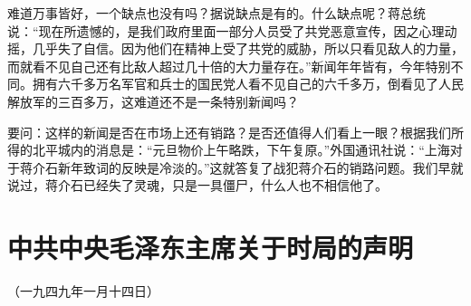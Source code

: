 \documentclass[UTF-8, a5paper, 12pt]{ctexart}
\begin{document}
难道万事皆好，一个缺点也没有吗？据说缺点是有的。什么缺点呢？蒋总统说：“现在所遗憾的，是我们政府里面一部分人员受了共党恶意宣传，因之心理动摇，几乎失了自信。因为他们在精神上受了共党的威胁，所以只看见敌人的力量，而就看不见自己还有比敌人超过几十倍的大力量存在。”新闻年年皆有，今年特别不同。拥有六千多万名军官和兵士的国民党人看不见自己的六千多万，倒看见了人民解放军的三百多万，这难道还不是一条特别新闻吗？

要问：这样的新闻是否在市场上还有销路？是否还值得人们看上一眼？根据我们所得的北平城内的消息是：“元旦物价上午略跌，下午复原。”外国通讯社说：“上海对于蒋介石新年致词的反映是冷淡的。”这就答复了战犯蒋介石的销路问题。我们早就说过，蒋介石已经失了灵魂，只是一具僵尸，什么人也不相信他了。

\section{中共中央毛泽东主席关于时局的声明}

（一九四九年一月十四日）
\end{document}
